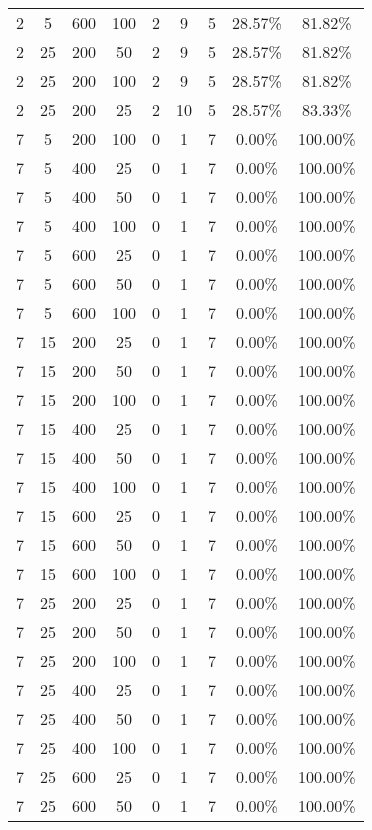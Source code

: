 \begin{center}
{\begin{longtable}{| c | c | c | c | c | c | c | c | c |}
 2 & 5 & 600 & 100 & 2 & 9 & 5 & 28.57\% & 81.82\%   \\
 2 & 25 & 200 & 50 & 2 & 9 & 5 & 28.57\% & 81.82\%   \\
 2 & 25 & 200 & 100 & 2 & 9 & 5 & 28.57\% & 81.82\%   \\
 2 & 25 & 200 & 25 & 2 & 10 & 5 & 28.57\% & 83.33\%   \\
 7 & 5 & 200 & 100 & 0 & 1 & 7 & 0.00\% & 100.00\%   \\
 7 & 5 & 400 & 25 & 0 & 1 & 7 & 0.00\% & 100.00\%   \\
 7 & 5 & 400 & 50 & 0 & 1 & 7 & 0.00\% & 100.00\%   \\
 7 & 5 & 400 & 100 & 0 & 1 & 7 & 0.00\% & 100.00\%   \\
 7 & 5 & 600 & 25 & 0 & 1 & 7 & 0.00\% & 100.00\%   \\
 7 & 5 & 600 & 50 & 0 & 1 & 7 & 0.00\% & 100.00\%   \\
 7 & 5 & 600 & 100 & 0 & 1 & 7 & 0.00\% & 100.00\%   \\
 7 & 15 & 200 & 25 & 0 & 1 & 7 & 0.00\% & 100.00\%   \\
 7 & 15 & 200 & 50 & 0 & 1 & 7 & 0.00\% & 100.00\%   \\
 7 & 15 & 200 & 100 & 0 & 1 & 7 & 0.00\% & 100.00\%   \\
 7 & 15 & 400 & 25 & 0 & 1 & 7 & 0.00\% & 100.00\%   \\
 7 & 15 & 400 & 50 & 0 & 1 & 7 & 0.00\% & 100.00\%   \\
  7 & 15 & 400 & 100 & 0 & 1 & 7 & 0.00\% & 100.00\%   \\
 7 & 15 & 600 & 25 & 0 & 1 & 7 & 0.00\% & 100.00\%   \\
 7 & 15 & 600 & 50 & 0 & 1 & 7 & 0.00\% & 100.00\%   \\
 7 & 15 & 600 & 100 & 0 & 1 & 7 & 0.00\% & 100.00\%   \\
 7 & 25 & 200 & 25 & 0 & 1 & 7 & 0.00\% & 100.00\%   \\
 7 & 25 & 200 & 50 & 0 & 1 & 7 & 0.00\% & 100.00\%   \\
 7 & 25 & 200 & 100 & 0 & 1 & 7 & 0.00\% & 100.00\%   \\
 7 & 25 & 400 & 25 & 0 & 1 & 7 & 0.00\% & 100.00\%   \\
 7 & 25 & 400 & 50 & 0 & 1 & 7 & 0.00\% & 100.00\%   \\
 7 & 25 & 400 & 100 & 0 & 1 & 7 & 0.00\% & 100.00\%   \\
 7 & 25 & 600 & 25 & 0 & 1 & 7 & 0.00\% & 100.00\%   \\
 7 & 25 & 600 & 50 & 0 & 1 & 7 & 0.00\% & 100.00\%   \\

\end{longtable}}
\end{center}
